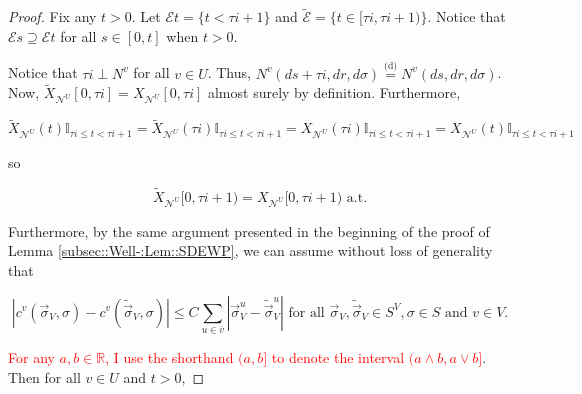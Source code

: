 \documentclass[12pt]{article}
\newcommand{\mb}{\mathbb}
\newcommand{\mc}{\mathcal}
\newcommand{\ov}{\overline}
\newcommand{\te}{\text}
\newcommand{\tr}{\textcolor{red}}
\newcommand{\ind}{\hspace{24pt}}
\newcommand{\deq}{\overset{\text{(d)}}{=}}			%
\renewcommand{\v}{v}							%
\newcommand{\vv}{u}								%
\renewcommand{\U}{U}							%
\renewcommand{\S}{S}							%
\newcommand{\s}{\sigma}							%
\newcommand{\sv}{\vec{\s}}						%
\renewcommand{\t}{t}							%
\renewcommand{\tt}{s}							%
\newcommand{\X}{X}								%
\newcommand{\IGr}{c}							%
\newcommand{\neigh}{\mc{N}}						%
\newcommand{\vind}[1]{^{#1}}					%
\newcommand{\carp}[1]{^{#1}}					%
\newcommand{\vsi}[1]{^{#1}}						%
\newcommand{\cind}[1]{_{#1}}					%
\newcommand{\cl}{\ov}							%
\newcommand{\tp}[1]{(#1)}						%
\newcommand{\tip}[1]{#1}						%
\newcommand{\const}{C}							%
\newcommand{\poiss}{N}							%
\newcommand{\alt}[1]{\widetilde{#1}}			%
\newcommand{\indx}[1]{_{#1}}					%
\newcommand{\rt}{\tau}							%
\newcommand{\evnt}{\mc{E}}						%
\begin{document}
\begin{proof}
\ind Fix any \(\t > 0\). Let \(\evnt{\t} = \{\t < \rt{i+1}\}\) and \(\alt{\evnt}{	} = \{\t\in [\rt{i},\rt{i+1})\}\). Notice that \(\evnt{\tt} \supseteq \evnt{\t}\) for all \(\tt\in [0,\t]\) when \(\t > 0\). 

\ind Notice that \(\rt{i} \perp \poiss\vind{\v}\) for all \(\v \in \U\). Thus, \(\poiss\vind{\v}(d\tt+\rt{i},dr,d\s) \deq \poiss\vind{\v}(d\tt,dr,d\s)\). Now, \(\alt{\X}\cind{\neigh\vind{\U}}\tip{[0,\rt{i}]} = \X\cind{\neigh\vind{\U}}\tip{[0,\rt{i}]}\) almost surely by definition. Furthermore,

\[\alt{\X}\cind{\neigh\vind{\U}}\tp{\t}\mb{I}_{\rt{i}\leq \t < \rt{i+1}} = \alt{\X}\cind{\neigh\vind{\U}}\tp{\rt{i}}\mb{I}_{\rt{i}\leq \t < \rt{i+1}} = \X\cind{\neigh\vind{\U}}\tp{\rt{i}}\mb{I}_{\rt{i}\leq \t < \rt{i+1}} = \X\cind{\neigh\vind{\U}}\tp{\t}\mb{I}_{\rt{i}\leq \t < \rt{i+1}}\]

so

\[\alt{\X}\cind{\neigh\vind{\U}}\tip{[0,\rt{i+1})} = \X\cind{\neigh\vind{\U}}\tip{[0,\rt{i+1})} \te{ a.t.}\]

Furthermore, by the same argument presented in the beginning of the proof of Lemma \ref{subsec::Well-:Lem::SDEWP}, we can assume without loss of generality that 

\[|\IGr\vind{\v}(\sv\cind{V}\vsi{},\s) - \IGr\vind{\v}(\alt{\sv}\cind{V}\vsi{},\s)| \leq \const\indx{}\sum_{\vv\in \cl{\v}} |\sv\cind{V}\vsi{\vv} - \alt{\sv}\cind{V}\vsi{\vv}|\te{ for all } \sv\cind{V}\vsi{},\alt{\sv}\cind{V}\vsi{}\in \S\carp{V},\s \in \S \te{ and } \v \in V.\]

\tr{For any \(a,b\in \mb{R}\), I use the shorthand \((a,b]\) to denote the interval \((a\wedge b,a\vee b]\)}. Then for all \(v\in \U\) and \(\t > 0\),


\end{proof}
\end{document}

